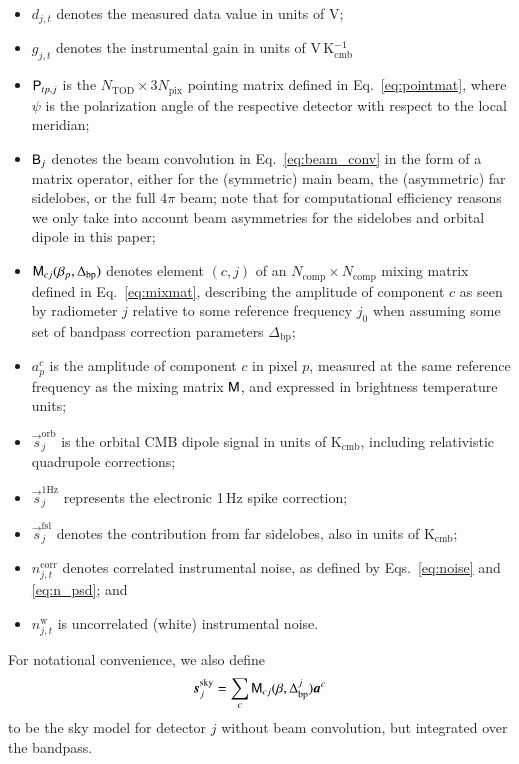 \documentclass[twocolumn]{aa}
\newcommand{\s}[0]{\vec{s}}
\renewcommand{\a}[0]{\vec{a}}
\newcommand{\B}[0]{\tens{B}}
\newcommand{\M}[0]{\tens{M}}
\renewcommand{\P}[0]{\tens{P}}
\newcommand{\Dbp}[0]{\Delta_{\mathrm{bp}}}
\begin{document}
\begin{itemize}
\item $d_{j,t}$ denotes the measured data value in units of V;
\item $g_{j,t}$ denotes the instrumental gain in units of V\,K$_{\mathrm{cmb}}^{-1}$
\item $\P_{tp,j}$ is the $N_{\mathrm{TOD}}\times 3N_{\mathrm{pix}}$
  pointing matrix defined in Eq.~\eqref{eq:pointmat}, where $\psi$ is
  the polarization angle of the respective detector with respect to
  the local meridian;
\item $\B_{j}$ denotes the beam convolution in
  Eq.~\eqref{eq:beam_conv} in the form of a matrix operator, either
  for the (symmetric) main beam, the (asymmetric) far sidelobes, or
  the full $4\pi$ beam; note that for computational efficiency reasons
  we only take into account beam asymmetries for the sidelobes and
  orbital dipole in this paper;
\item $\M_{cj}(\beta_{p}, \Dbp)$ denotes element $(c,j)$ of an
  $N_{\mathrm{comp}}\times N_{\mathrm{comp}}$ mixing matrix defined in
  Eq.~\eqref{eq:mixmat}, describing the amplitude of component $c$ as
  seen by radiometer $j$ relative to some reference frequency $j_0$
  when assuming some set of bandpass correction parameters $\Dbp$;
\item $a^c_{p}$ is the amplitude of component $c$ in pixel $p$,
  measured at the same reference frequency as the mixing matrix $\M$,
  and expressed in brightness temperature units;
\item $\s^{\mathrm{orb}}_{j}$ is the orbital CMB dipole signal in units
  of K$_{\mathrm{cmb}}$, including relativistic quadrupole
  corrections;
\item $\s^{\mathrm{1Hz}}_{j}$ represents the electronic 1\,Hz spike
  correction;
\item $\s^{\mathrm{fsl}}_{j}$ denotes the contribution from far
  sidelobes, also in units of K$_{\mathrm{cmb}}$;
\item $n^{\mathrm{corr}}_{j,t}$ denotes correlated instrumental noise,
  as defined by Eqs.~\eqref{eq:noise} and \eqref{eq:n_psd}; and
\item $n^{\mathrm{w}}_{j,t}$ is uncorrelated (white) instrumental
  noise.
\end{itemize}
For notational convenience, we also define
\begin{equation}
    \s^{\mathrm{sky}}_{j} = \sum_{c} \M_{cj}(\beta, \Dbp^{j})\a^c
\end{equation}
to be the sky model for detector $j$ without beam convolution, but
integrated over the bandpass.
\end{document}
